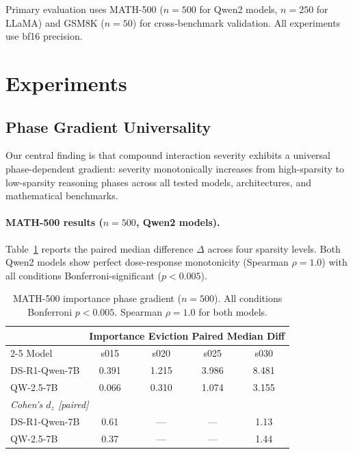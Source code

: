 \documentclass[11pt,a4paper]{article}
\begin{document}
Primary evaluation uses MATH-500 ($n = 500$ for Qwen2 models, $n = 250$ for LLaMA) and GSM8K ($n = 50$) for cross-benchmark validation. All experiments use bf16 precision.

\section{Experiments}

\subsection{Phase Gradient Universality}
\label{sec:phase-gradient}

Our central finding is that compound interaction severity exhibits a universal phase-dependent gradient: severity monotonically increases from high-sparsity to low-sparsity reasoning phases across all tested models, architectures, and mathematical benchmarks.

\paragraph{MATH-500 results ($n = 500$, Qwen2 models).} Table~\ref{tab:math500} reports the paired median difference $\Delta$ across four sparsity levels. Both Qwen2 models show perfect dose-response monotonicity (Spearman $\rho = 1.0$) with all conditions Bonferroni-significant ($p < 0.005$).

\begin{table}[t]
\centering
\small
\begin{tabular}{lcccc}
\toprule
& \multicolumn{4}{c}{Importance Eviction Paired Median Diff} \\
\cmidrule(lr){2-5}
Model & s015 & s020 & s025 & s030 \\
\midrule
DS-R1-Qwen-7B & 0.391 & 1.215 & 3.986 & 8.481 \\
QW-2.5-7B & 0.066 & 0.310 & 1.074 & 3.155 \\
\midrule
\multicolumn{5}{l}{\textit{Cohen's $d_z$ [paired]}} \\
DS-R1-Qwen-7B & 0.61 & --- & --- & 1.13 \\
QW-2.5-7B & 0.37 & --- & --- & 1.44 \\
\bottomrule
\end{tabular}
\caption{MATH-500 importance phase gradient ($n = 500$). All conditions Bonferroni $p < 0.005$. Spearman $\rho = 1.0$ for both models.}
\label{tab:math500}
\end{table}
\end{document}
